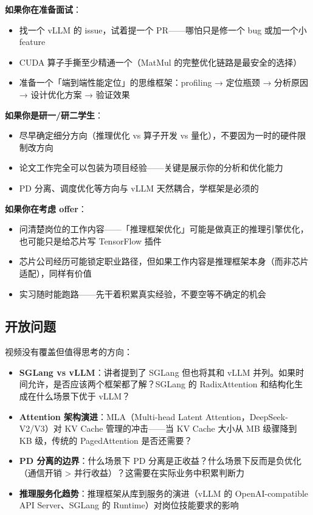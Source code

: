 \documentclass[a4paper]{article}
\begin{document}
\textbf{如果你在准备面试}：
\begin{itemize}
  \item 找一个 vLLM 的 issue，试着提一个 PR——哪怕只是修一个 bug 或加一个小 feature
  \item CUDA 算子手撕至少精通一个（MatMul 的完整优化链路是最安全的选择）
  \item 准备一个「端到端性能定位」的思维框架：profiling → 定位瓶颈 → 分析原因 → 设计优化方案 → 验证效果
\end{itemize}

\textbf{如果你是研一/研二学生}：
\begin{itemize}
  \item 尽早确定细分方向（推理优化 vs 算子开发 vs 量化），不要因为一时的硬件限制改方向
  \item 论文工作完全可以包装为项目经验——关键是展示你的分析和优化能力
  \item PD 分离、调度优化等方向与 vLLM 天然耦合，学框架是必须的
\end{itemize}

\textbf{如果你在考虑 offer}：
\begin{itemize}
  \item 问清楚岗位的工作内容——「推理框架优化」可能是做真正的推理引擎优化，也可能只是给芯片写 TensorFlow 插件
  \item 芯片公司经历可能锁定职业路径，但如果工作内容是推理框架本身（而非芯片适配），同样有价值
  \item 实习随时能跑路——先干着积累真实经验，不要空等不确定的机会
\end{itemize}

\subsection{开放问题}

视频没有覆盖但值得思考的方向：

\begin{itemize}
  \item \textbf{SGLang vs vLLM}：讲者提到了 SGLang 但也将其和 vLLM 并列。如果时间允许，是否应该两个框架都了解？SGLang 的 RadixAttention 和结构化生成在什么场景下优于 vLLM？
  \item \textbf{Attention 架构演进}：MLA（Multi-head Latent Attention，DeepSeek-V2/V3）对 KV Cache 管理的冲击——当 KV Cache 大小从 MB 级骤降到 KB 级，传统的 PagedAttention 是否还需要？
  \item \textbf{PD 分离的边界}：什么场景下 PD 分离是正收益？什么场景下反而是负优化（通信开销 > 并行收益）？这需要在实际业务中积累判断力
  \item \textbf{推理服务化趋势}：推理框架从库到服务的演进（vLLM 的 OpenAI-compatible API Server、SGLang 的 Runtime）对岗位技能要求的影响
\end{itemize}
\end{document}
